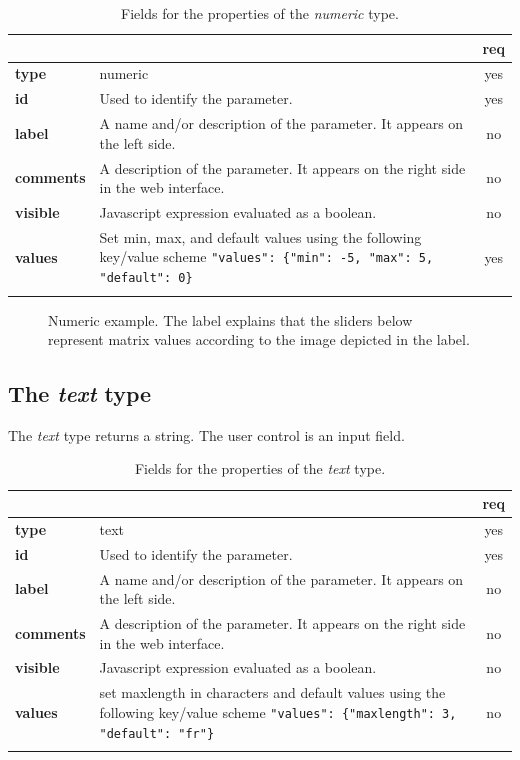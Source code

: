 \begin{longtable}{|>{\bf}L{\linewidth}|L{\linewidth}|c|}
\hline
      &  & {\bf req} 
\tabularnewline \hline \hline
 type       & numeric   & yes \\ \hline
 id     & Used to identify the parameter. & yes \\ \hline
 label  & A name and/or description of the parameter. It appears on the left side. & no
                      \\ \hline
 comments & A description of the parameter. It appears on the right side in the web interface. & no
                      \\ \hline
 visible    & Javascript expression evaluated as a boolean. & no \\ \hline
 values     & Set min, max, and default values using the following key/value scheme \texttt{"values": \{"min": -5, "max": 5, "default": 0\}} & yes \\ \hline
\caption{Fields for the properties of the \emph{numeric} type.}
\end{longtable}

\begin{figure}[h!]
\centering
{}
\caption{Numeric example. The label explains that the sliders below represent matrix values according to the image depicted in the label.}
\label{fig:numeric_example}
\end{figure}

\subsection{The \emph{text} type}

The \emph{text} type returns a string. The user control is an input field.

\begin{longtable}{|>{\bf}L{\linewidth}|L{\linewidth}|c|}
\hline
      &  & {\bf req} 
\tabularnewline \hline \hline
 type       & text   & yes \\ \hline
 id     & Used to identify the parameter. & yes \\ \hline
 label  & A name and/or description of the parameter. It appears on the left side. & no
                      \\ \hline
 comments & A description of the parameter. It appears on the right side in the web interface. & no
                      \\ \hline
 visible    & Javascript expression evaluated as a boolean. & no \\ \hline
 values     & set maxlength in characters and default values using the following key/value scheme \texttt{"values": \{"maxlength": 3, "default": "fr"\}} & no \\ \hline
\caption{Fields for the properties of the \emph{text} type.}
\end{longtable}

